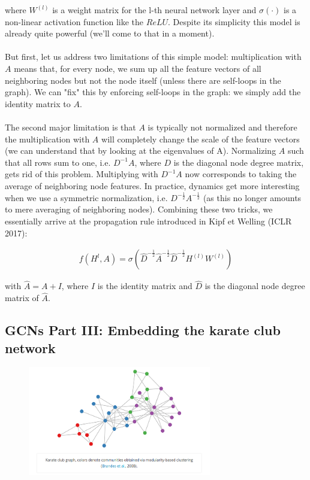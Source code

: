 \documentclass[12pt,a4paper]{article}
\begin{document}
where $W^{(l)}$ is a weight matrix for the l-th neural network layer and $\sigma(\cdot)$ is a non-linear activation function like the $ReLU$. Despite its simplicity this model is already quite powerful (we'll come to that in a moment).
\\ \\
But first, let us address two limitations of this simple model: multiplication with $A$ means that, for every node, we sum up all the feature vectors of all neighboring nodes but not the node itself (unless there are self-loops in the graph). We can "fix" this by enforcing self-loops in the graph: we simply add the identity matrix to $A$. 
\\ \\
The second major limitation is that $A$ is typically not normalized and therefore the multiplication with $A$ will completely change the scale of the feature vectors (we can understand that by looking at the eigenvalues of A). Normalizing $A$ such that all rows sum to one, i.e. $D^{-1}A$, where $D$ is the diagonal node degree matrix, gets rid of this problem. Multiplying with $D^{-1}A$ now corresponds to taking the average of neighboring node features. In practice, dynamics get more interesting when we use a symmetric normalization, i.e. $D^{-\frac{1}{2}}A^{-\frac{1}{2}}$ (as this no longer amounts to mere averaging of neighboring nodes). Combining these two tricks, we essentially arrive at the propagation rule introduced in Kipf et Welling (ICLR 2017):

\begin{align*}
f(H^{l},A) = \sigma (\hat{D}^{-\frac{1}{2}}\hat{A}^{-\frac{1}{2}}\hat{D}^{-\frac{1}{2}}H^{(l)}W^{(l)})
\end{align*}

with $\hat{A}=A+I$, where $I$ is the identity matrix and $\hat{D}$ is the diagonal node degree matrix of $\hat{A}$.

\subsection*{GCNs Part III: Embedding the karate club network}

\begin{figure}[h]
\includegraphics[width=8cm]{GCN-karate-club-network}
\centering
\end{figure}
\end{document}
